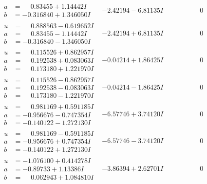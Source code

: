\documentclass[1p]{elsarticle_modified}
\theoremstyle{definition}
\begin{document}
$$\begin{array}{c|c|c}
\begin{aligned}
a &= \phantom{-}0.83455 + 1.14442 I \\
b &= -0.316840 + 1.346050 I\end{aligned}
 & -2.42194 - 6.81135 I & \phantom{-0.000000 } 0 \\ \hline\begin{aligned}
u &= \phantom{-}0.888563 - 0.619652 I \\
a &= \phantom{-}0.83455 - 1.14442 I \\
b &= -0.316840 - 1.346050 I\end{aligned}
 & -2.42194 + 6.81135 I & \phantom{-0.000000 } 0 \\ \hline\begin{aligned}
u &= \phantom{-}0.115526 + 0.862957 I \\
a &= \phantom{-}0.192538 + 0.083063 I \\
b &= \phantom{-}0.173180 + 1.221970 I\end{aligned}
 & -0.04214 + 1.86425 I & \phantom{-0.000000 } 0 \\ \hline\begin{aligned}
u &= \phantom{-}0.115526 - 0.862957 I \\
a &= \phantom{-}0.192538 - 0.083063 I \\
b &= \phantom{-}0.173180 - 1.221970 I\end{aligned}
 & -0.04214 - 1.86425 I & \phantom{-0.000000 } 0 \\ \hline\begin{aligned}
u &= \phantom{-}0.981169 + 0.591185 I \\
a &= -0.956676 - 0.747354 I \\
b &= -0.140122 - 1.272130 I\end{aligned}
 & -6.57746 + 3.74120 I & \phantom{-0.000000 } 0 \\ \hline\begin{aligned}
u &= \phantom{-}0.981169 - 0.591185 I \\
a &= -0.956676 + 0.747354 I \\
b &= -0.140122 + 1.272130 I\end{aligned}
 & -6.57746 - 3.74120 I & \phantom{-0.000000 } 0 \\ \hline\begin{aligned}
u &= -1.076100 + 0.414278 I \\
a &= -0.89733 + 1.13386 I \\
b &= \phantom{-}0.062943 + 1.084810 I\end{aligned}
 & -3.86394 + 2.62701 I & \phantom{-0.000000 } 0 \\ \hline\begin{aligned}

\end{aligned}
\end{array}$$
\end{document}
